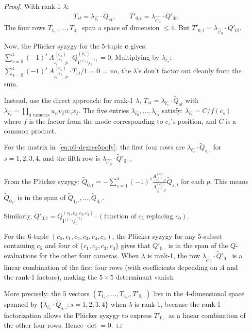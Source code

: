 \begin{proof}
With rank-1 $\lambda$:
\[
  T_{st} = \lambda_{\widehat{c_s}}\cdot\widetilde{Q}_{st}, \qquad
  T'_{0,t} = \lambda_{\widehat{c'_0}}\cdot\widetilde{Q}'_{0t}.
\]
The four rows $T_{1,\cdot},\ldots,T_{4,\cdot}$ span a space of dimension $\leq 4$.
But $T'_{0,t} = \lambda_{\widehat{c'_0}}\cdot\widetilde{Q}'_{0t}$.

Now, the Pl\"ucker syzygy for the 5-tuple $\mathbf{c}$ gives:
$\sum_{s=0}^{4} (-1)^s \, A^{(c_s)}_{i^{(t)}_s, p}\cdot Q^{(\widehat{c_s})}_{\mathbf{i}^{(t)}\setminus i^{(t)}_s} = 0$.
Multiplying by $\lambda_{\widehat{c_s}}$:
$\sum_{s=0}^{4} (-1)^s \, A^{(c_s)}_{i^{(t)}_s, p}\cdot T_{st}/1 = 0$
... no, the $\lambda$'s don't factor out cleanly from the sum.

Instead, use the direct approach: for rank-1 $\lambda$,
$T_{st} = \lambda_{\widehat{c_s}}\cdot\widetilde{Q}_{st}$
with $\lambda_{\widehat{c_s}} = \prod_{\text{4 cameras}} u_\alpha v_\beta w_\gamma x_\delta$.
The five entries $\lambda_{\widehat{c_0}},\ldots,\lambda_{\widehat{c_4}}$
satisfy: $\lambda_{\widehat{c_s}} = C / f(c_s)$ where $f$ is the factor from
the mode corresponding to $c_s$'s position, and $C$ is a common product.

For the matrix in~\eqref{eq:p9-degree5poly}: the first four rows are
$\lambda_{\widehat{c_s}}\cdot\widetilde{Q}_{s,\cdot}$ for $s=1,2,3,4$,
and the fifth row is $\lambda_{\widehat{c'_0}}\cdot\widetilde{Q}'_{0,\cdot}$.

From the Pl\"ucker syzygy: $\widetilde{Q}_{0,t} = -\sum_{s=1}^{4}(-1)^s\frac{A^{(c_s)}_{i^{(t)}_s,p}}{A^{(c_0)}_{i^{(t)}_0,p}}\widetilde{Q}_{s,t}$ for each $p$.
This means $\widetilde{Q}_{0,\cdot}$ is in the span of $\widetilde{Q}_{1,\cdot},\ldots,\widetilde{Q}_{4,\cdot}$.

Similarly, $\widetilde{Q}'_{0,t} = Q^{(c_1,c_2,c_3,c_4)}_{\mathbf{i}^{(t)}\setminus i^{(t)}_0}
\cdot (\text{function of } c_5\text{ replacing }c_0)$.

For the 6-tuple $(c_0,c_1,c_2,c_3,c_4,c_5)$, the Pl\"ucker syzygy for
any 5-subset containing $c_5$ and four of $\{c_1,c_2,c_3,c_4\}$ gives that
$\widetilde{Q}'_{0,\cdot}$ is in the span of the $Q$-evaluations for the
other four cameras. When $\lambda$ is rank-1, the row
$\lambda_{\widehat{c'_0}}\cdot\widetilde{Q}'_{0,\cdot}$ is a linear combination
of the first four rows (with coefficients depending on $A$ and the rank-1
factors), making the $5\times 5$ determinant vanish.

More precisely: the 5 vectors $(T_{1,\cdot},\ldots,T_{4,\cdot},T'_{0,\cdot})$
live in the 4-dimensional space spanned by
$\{\lambda_{\widehat{c_s}}\cdot\widetilde{Q}_{s,\cdot} : s = 1,2,3,4\}$
when $\lambda$ is rank-1, because the rank-1 factorization allows the
Pl\"ucker syzygy to express $T'_{0,\cdot}$ as a linear combination of the other four rows. Hence $\det = 0$.
\end{proof}

